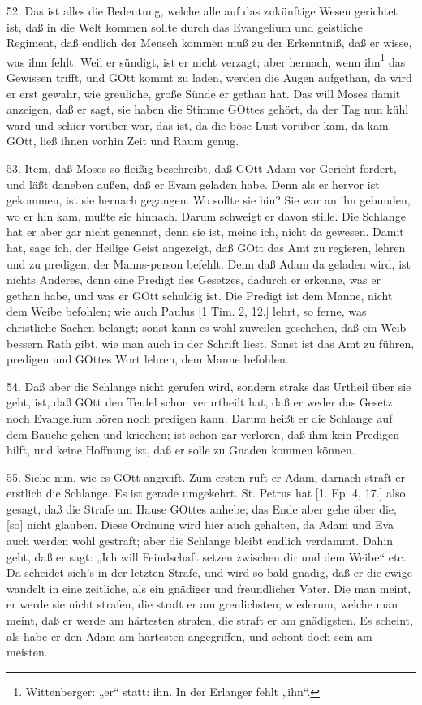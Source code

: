 52. Das ist alles die Bedeutung, welche alle auf das zukünftige Wesen gerichtet ist, daß in die Welt kommen sollte durch das Evangelium und geistliche Regiment, daß endlich der Mensch kommen muß zu der Erkenntniß, daß er wisse, was ihm fehlt. Weil er sündigt, ist er nicht verzagt; aber hernach, wenn ihn\footnote{Wittenberger: „er“ statt: ihn. In der Erlanger fehlt „ihn“.} das Gewissen trifft, und GOtt kommt zu laden, werden die Augen aufgethan, da wird er erst gewahr, wie greuliche, große Sünde er gethan hat. Das will Moses damit anzeigen, daß er sagt, sie haben die Stimme GOttes gehört, da der Tag nun kühl ward und schier vorüber war, das ist, da die böse Lust vorüber kam, da kam GOtt, ließ ihnen vorhin Zeit und Raum genug.

53. Item, daß Moses so fleißig beschreibt, daß GOtt Adam vor Gericht fordert, und läßt daneben außen, daß er Evam geladen habe. Denn als er hervor ist gekommen, ist sie hernach gegangen. Wo sollte sie hin? Sie war an ihn gebunden, wo er hin kam, mußte sie hinnach. Darum schweigt er davon stille. Die Schlange hat er aber gar nicht genennet, denn sie ist, meine ich, nicht da gewesen. Damit hat, sage ich, der Heilige Geist angezeigt, daß GOtt das Amt zu regieren, lehren und zu predigen, der Manns-person befehlt. Denn daß Adam da geladen wird, ist nichts Anderes, denn eine Predigt des Gesetzes, dadurch er erkenne, was er gethan habe, und was er GOtt schuldig ist. Die Predigt ist dem Manne, nicht dem Weibe befohlen; wie auch Paulus [1 Tim. 2, 12.] lehrt, so ferne, was christliche Sachen belangt; sonst kann es wohl zuweilen geschehen, daß ein Weib bessern Rath gibt, wie man auch in der Schrift liest. Sonst ist das Amt zu führen, predigen und GOttes Wort lehren, dem Manne befohlen.

54. Daß aber die Schlange nicht gerufen wird, sondern straks das Urtheil über sie geht, ist, daß GOtt den Teufel schon verurtheilt hat, daß er
weder das Gesetz noch Evangelium hören noch predigen kann. Darum heißt er die Schlange auf dem Bauche gehen und kriechen; ist schon gar verloren, daß ihm kein Predigen hilft, und keine Hoffnung ist, daß er solle zu Gnaden kommen können.

55. Siehe nun, wie es GOtt angreift. Zum ersten ruft er Adam, darnach straft er erstlich die Schlange. Es ist gerade umgekehrt. St. Petrus hat [1. Ep. 4, 17.] also gesagt, daß die Strafe am Hause GOttes anhebe; das Ende aber gehe über die, [so] nicht glauben. Diese Ordnung wird hier auch gehalten, da Adam und Eva auch werden wohl gestraft; aber die Schlange bleibt endlich verdammt. Dahin geht, daß er sagt: „Ich will Feindschaft setzen zwischen dir und dem Weibe“ etc. Da scheidet sich’s in der letzten Strafe, und wird so bald gnädig, daß er die ewige wandelt in eine zeitliche, als ein gnädiger und freundlicher Vater. Die man meint, er werde sie nicht strafen, die straft er am greulichsten; wiederum, welche man meint, daß er werde am härtesten strafen, die straft er am gnädigsten. Es scheint, als habe er den Adam am härtesten angegriffen, und schont doch sein am meisten.

